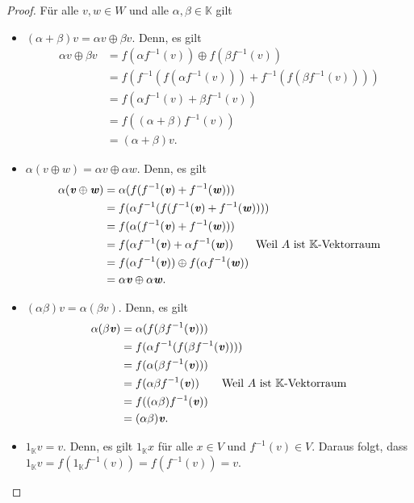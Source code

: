 \documentclass[12pt]{extarticle}
\newcommand{\ib}[1]{\boldsymbol{\mathit{#1}}}
\newcommand{\mg}[1]{\mathbb{#1}}
\begin{document}
\begin{proof}
  Für alle \(\ib{v}, \ib{w} \in W\) und alle $\alpha, \beta \in
  \mg{K}$ gilt
  \begin{itemize}
  \item \((\alpha + \beta) \ib{v}=\alpha \ib{v} \oplus \beta \ib{v}\).
    Denn, es gilt
\begin{align*}
  \alpha \ib{v} \oplus \beta \ib{v}
  &= f(\alpha f^{-1}(\ib{v})) \oplus f(\beta f^{-1}(\ib{v}))\\
  &= f(f^{-1}(f(\alpha f^{-1}{(\ib{v})}))+f^{-1}(f(\beta
    f^{-1}{(\ib{v})})))\\
  &= f(\alpha f^{-1}{(\ib{v})} + \beta f^{-1}{(\ib{v})})
    \tag*{\(f\) bijektiv}\\
  &= f((\alpha+\beta)f^{-1}{(\ib{v})})\\
  &= (\alpha+\beta)\ib{v}.
\end{align*}
  \item
    $\alpha (\ib{v} \oplus \ib{w}) = \alpha \ib{v} \oplus \alpha
    \ib{w} $.
    Denn, es gilt
\begin{align*}
  \alpha ( \ib{v} \oplus \ib{w} )
  &= \alpha ( f ( f^{-1}(\ib{v}) + f^{-1}(\ib{w})))\\
  &= f(\alpha f^{-1}(f ( f^{-1}(\ib{v}) + f^{-1}(\ib{w}))))\\
  &= f(\alpha( f^{-1}(\ib{v}) + f^{-1}(\ib{w})))\\
  &= f(\alpha f^{-1}(\ib{v}) + \alpha f^{-1}(\ib{w}))
    \tag*{Weil \(A\) ist \(\mg{K}\)-Vektorraum}\\
  &= f(\alpha f^{-1}(\ib{v})) \oplus f(\alpha f^{-1}(\ib{w}))\\
  &= \alpha \ib{v} \oplus \alpha \ib{w}.
\end{align*}
  \item \((\alpha\beta)\ib{v}=\alpha(\beta\ib{v})\).  Denn, es gilt
\begin{align*}
  \alpha(\beta\ib{v}) &= \alpha(f(\beta f^{-1}(\ib{v}))) \\
                      &= f(\alpha f^{-1}(f(\beta f^{-1}(\ib{v}))))\\
                      &= f(\alpha (\beta f^{-1}(\ib{v})))\\
                      &= f(\alpha \beta f^{-1}(\ib{v}))
                        \tag*{Weil \(A\) ist \(\mg{K}\)-Vektorraum}\\
                      &= f((\alpha \beta) f^{-1}(\ib{v}))\\
                      &= (\alpha \beta)\ib{v}.
\end{align*}
  \item \(1_{\mg{K}}\ib{v}=\ib{v}\).  Denn, es gilt $1_{\mg{K}}
    \ib{x}$ für alle \(\ib{x} \in V\) und \(f^{-1}(\ib{v}) \in V\).
    Daraus folgt, dass $1_{\mg{K}}\ib{v} =
    f(1_{\mg{K}}f^{-1}(\ib{v})) = f(f^{-1}(\ib{v})) = \ib{v}$.
  \end{itemize}
\end{proof}
\end{document}
